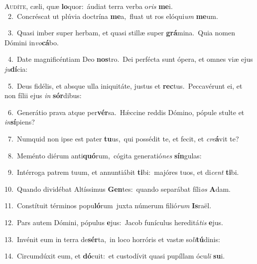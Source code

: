 \lettrine{\initial\textcolor{\initialcolor}{A}}{udíte,} cæli, quæ \textbf{lo}\-quor:~\star áudiat terra verba o\textit{ris} \textbf{me}\-i.\\
{\numbfont\textcolor{\numbcolor}{~2.}}~Concréscat ut plúvia doctrína \textbf{me}\-a,~\star fluat ut ros elóqui\textit{um} \textbf{me}\-um.\par
{\numbfont\textcolor{\numbcolor}{~3.}}~Quasi imber super herbam, et quasi stillæ super \textbf{grá}\-mina.~\star Quia nomen Dómini in\-\textit{vo}\-\textbf{cá}bo.\par
{\numbfont\textcolor{\numbcolor}{~4.}}~Date magnificéntiam Deo \textbf{nos}\-tro.~\star Dei perfécta sunt ópera, et omnes viæ ejus \textit{ju}\-\textbf{dí}cia:\par
{\numbfont\textcolor{\numbcolor}{~5.}}~Deus fidélis, et absque ulla iniquitáte, justus et \textbf{rec}\-tus.~\star Peccavérunt ei, et non fílii ejus \textit{in} \textbf{sór}\-dibus:\par
{\numbfont\textcolor{\numbcolor}{~6.}}~Generátio prava atque per\-\textbf{vér}\-sa.~\star Hǽccine reddis Dómino, pópule stulte et \textit{in}\-\textbf{sí}piens?\par
{\numbfont\textcolor{\numbcolor}{~7.}}~Numquid non ipse est pater \textbf{tu}\-us,~\star qui possédit te, et fecit, et \textit{cre}\-\textbf{á}vit te?\par
{\numbfont\textcolor{\numbcolor}{~8.}}~Meménto diérum anti\-\textbf{quó}\-rum,~\star cógita generatió\textit{nes} \textbf{sín}\-gulas:\par
{\numbfont\textcolor{\numbcolor}{~9.}}~Intérroga patrem tuum, et annuntiábit \textbf{ti}\-bi:~\star majóres tuos, et di\textit{cent} \textbf{ti}\-bi.\par
{\numbfont\textcolor{\numbcolor}{10.}}~Quando dividébat Altíssimus \textbf{Gen}\-tes:~\star quando separábat fíli\textit{os} \textbf{A}\-dam.\par
{\numbfont\textcolor{\numbcolor}{11.}}~Constítuit términos popu\-\textbf{ló}\-rum~\star juxta númerum filió\textit{rum} \textbf{Is}\-raël.\par
{\numbfont\textcolor{\numbcolor}{12.}}~Pars autem Dómini, pópulus \textbf{e}\-jus:~\star Jacob funículus hereditá\textit{tis} \textbf{e}\-jus.\par
{\numbfont\textcolor{\numbcolor}{13.}}~Invénit eum in terra de\-\textbf{sér}\-ta,~\star in loco horróris et vastæ so\-\textit{li}\-\textbf{tú}dinis:\par
{\numbfont\textcolor{\numbcolor}{14.}}~Circumdúxit eum, et \textbf{dó}\-cuit:~\star et custodívit quasi pupíllam ócu\textit{li} \textbf{su}\-i.\par
